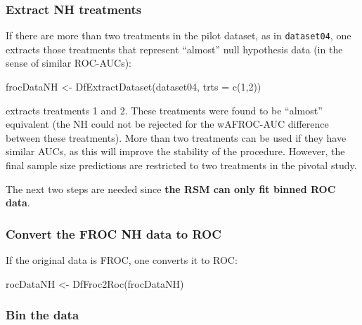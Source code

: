\documentclass[
]{book}
\newenvironment{Shaded}{\begin{snugshade}}{\end{snugshade}}
\newcommand{\AttributeTok}[1]{\textcolor[rgb]{0.77,0.63,0.00}{#1}}
\newcommand{\DecValTok}[1]{\textcolor[rgb]{0.00,0.00,0.81}{#1}}
\newcommand{\FunctionTok}[1]{\textcolor[rgb]{0.00,0.00,0.00}{#1}}
\newcommand{\NormalTok}[1]{#1}
\newcommand{\OtherTok}[1]{\textcolor[rgb]{0.56,0.35,0.01}{#1}}
\begin{document}
\hypertarget{extract-nh-treatments}{%
\subsubsection{Extract NH treatments}\label{extract-nh-treatments}}

If there are more than two treatments in the pilot dataset, as in \texttt{dataset04}, one extracts those treatments that represent ``almost'' null hypothesis data (in the sense of similar ROC-AUCs):

\begin{Shaded}
\begin{Highlighting}[]
\NormalTok{frocDataNH }\OtherTok{\textless{}{-}} \FunctionTok{DfExtractDataset}\NormalTok{(dataset04, }\AttributeTok{trts =} \FunctionTok{c}\NormalTok{(}\DecValTok{1}\NormalTok{,}\DecValTok{2}\NormalTok{))}
\end{Highlighting}
\end{Shaded}

extracts treatments 1 and 2. These treatments were found \citep{zanca2009evaluation} to be ``almost'' equivalent (the NH could not be rejected for the wAFROC-AUC difference between these treatments). More than two treatments can be used if they have similar AUCs, as this will improve the stability of the procedure. However, the final sample size predictions are restricted to two treatments in the pivotal study.

The next two steps are needed since \textbf{the RSM can only fit binned ROC data}.

\hypertarget{convert-the-froc-nh-data-to-roc}{%
\subsubsection{Convert the FROC NH data to ROC}\label{convert-the-froc-nh-data-to-roc}}

If the original data is FROC, one converts it to ROC:

\begin{Shaded}
\begin{Highlighting}[]
\NormalTok{rocDataNH }\OtherTok{\textless{}{-}} \FunctionTok{DfFroc2Roc}\NormalTok{(frocDataNH)}
\end{Highlighting}
\end{Shaded}

\hypertarget{bin-the-data}{%
\subsubsection{Bin the data}\label{bin-the-data}}
\end{document}
